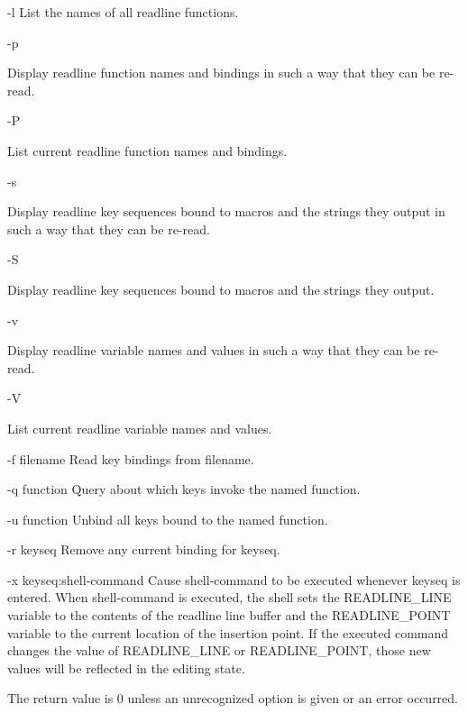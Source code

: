 \begin{longtable}
-l
List the names of all readline functions.

-p

Display readline function names and bindings in such a way that they can be re-read.

-P

List current readline function names and bindings.

-s

Display readline key sequences bound to macros and the strings they output in such a way that they can be re-read.

-S

Display readline key sequences bound to macros and the strings they output.

-v

Display readline variable names and values in such a way that they can be re-read.

-V

List current readline variable names and values.

-f filename
Read key bindings from filename.

-q function
Query about which keys invoke the named function.

-u function
Unbind all keys bound to the named function.

-r keyseq
Remove any current binding for keyseq.

-x keyseq:shell-command
Cause shell-command to be executed whenever keyseq is entered. When shell-command is executed, the shell sets the READLINE\_LINE variable to the contents of the readline line buffer and the READLINE\_POINT variable to the current location of the insertion point. If the executed command changes the value of READLINE\_LINE or READLINE\_POINT, those new values will be reflected in the editing state.

The return value is 0 unless an unrecognized option is given or an error occurred.


\end{longtable}
